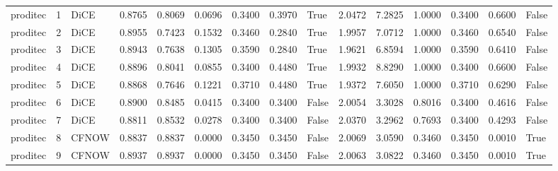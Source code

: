 \begin{tabular}{lrlrrrrrlrrrrrl}
proditec &      1 &   DiCE &      0.8765 &    0.8069 &       0.0696 &                 0.3400 &           0.3970 &            True &       2.0472 &                  7.2825 &                              1.0000 &         0.3400 &                0.6600 &                 False \\
proditec &      2 &   DiCE &      0.8955 &    0.7423 &       0.1532 &                 0.3460 &           0.2840 &            True &       1.9957 &                  7.0712 &                              1.0000 &         0.3460 &                0.6540 &                 False \\
proditec &      3 &   DiCE &      0.8943 &    0.7638 &       0.1305 &                 0.3590 &           0.2840 &            True &       1.9621 &                  6.8594 &                              1.0000 &         0.3590 &                0.6410 &                 False \\
proditec &      4 &   DiCE &      0.8896 &    0.8041 &       0.0855 &                 0.3400 &           0.4480 &            True &       1.9932 &                  8.8290 &                              1.0000 &         0.3400 &                0.6600 &                 False \\
proditec &      5 &   DiCE &      0.8868 &    0.7646 &       0.1221 &                 0.3710 &           0.4480 &            True &       1.9372 &                  7.6050 &                              1.0000 &         0.3710 &                0.6290 &                 False \\
proditec &      6 &   DiCE &      0.8900 &    0.8485 &       0.0415 &                 0.3400 &           0.3400 &           False &       2.0054 &                  3.3028 &                              0.8016 &         0.3400 &                0.4616 &                 False \\
proditec &      7 &   DiCE &      0.8811 &    0.8532 &       0.0278 &                 0.3400 &           0.3400 &           False &       2.0370 &                  3.2962 &                              0.7693 &         0.3400 &                0.4293 &                 False \\
proditec &      8 &  CFNOW &      0.8837 &    0.8837 &       0.0000 &                 0.3450 &           0.3450 &           False &       2.0069 &                  3.0590 &                              0.3460 &         0.3450 &                0.0010 &                  True \\
proditec &      9 &  CFNOW &      0.8937 &    0.8937 &       0.0000 &                 0.3450 &           0.3450 &           False &       2.0063 &                  3.0822 &                              0.3460 &         0.3450 &                0.0010 &                  True \\

\end{tabular}

